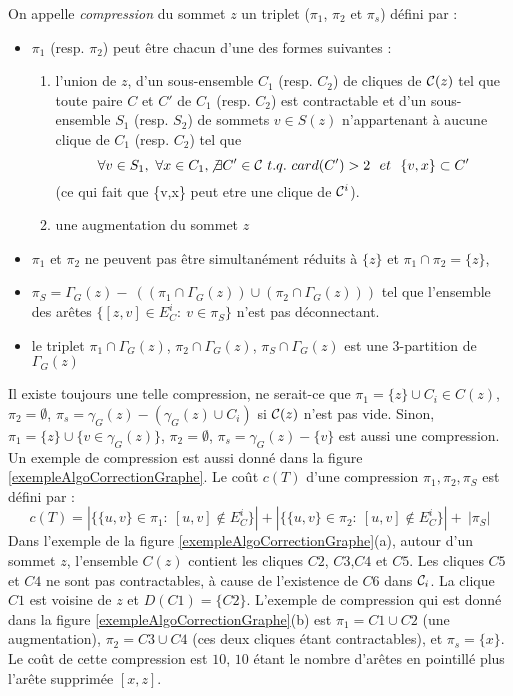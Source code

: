 \begin{definition}
On appelle {\em compression} du sommet $z$ un triplet ($\pi_1$, $\pi_2$ et $\pi_s$) d\'efini par : 
\begin{itemize}
	\item $\pi_1$ (resp. $\pi_2$) peut \^etre  chacun d'une des formes suivantes :
	\begin{enumerate}
		\item l'union de $z$, d'un sous-ensemble $C_1$ (resp. $C_2$) de cliques de ${\cal C}(z)$ tel que toute paire $C$ et $C'$ de $C_1$ (resp. $C_2$) est contractable et d'un sous-ensemble $S_1$ (resp. $S_2$) de sommets $v \in S(z)$ n'appartenant \`a aucune clique de $C_1$ (resp. $C_2$) tel que
		$$ \forall v \in S_1,~\forall x \in C_1, \not\exists C' \in {\cal C}~t.q.~card(C')>2~~et~~\{v,x\} \subset C'$$
		(ce qui fait que \{v,x\} peut etre une clique de ${\cal C}^i$).
		\item une augmentation du sommet $z$
	\end{enumerate}
	\item $\pi_1$ et $\pi_2$ ne peuvent pas \^etre simultan\'ement r\'eduits \`a $\{z\}$ et $\pi_1 \cap \pi_2 = \{z\}$,
	\item $\pi_S=\Gamma_G(z)-~((\pi_1 \cap \Gamma_G(z)) \cup(\pi_2 \cap \Gamma_G(z)))$ tel que l'ensemble des ar\^etes  $\{[z,v]\in E_{C}^{i}:~v\in \pi_S\}$ n'est pas d\'econnectant.
	\item le triplet $\pi_{1} \cap \Gamma_{G}(z)$, $\pi_{2} \cap \Gamma_{G}(z)$, $\pi_{S} \cap \Gamma_{G}(z)$  est une 3-partition de $\Gamma_G(z)$
\end{itemize}
\end{definition}
Il existe toujours une telle compression, ne serait-ce que 
$\pi_1 = \{z\} \cup C_i \in C(z)$, 
$\pi_2 =  \emptyset$,
$\pi_s = \gamma_G(z) -(\gamma_G(z) \cup C_i) $  si ${\cal C}(z)$ n'est pas vide.
Sinon, 
$\pi_1 = \{z\} \cup \{ v \in \gamma_G(z)  \} $, 
$\pi_2 =  \emptyset$,
$\pi_s = \gamma_G(z) - \{v\} $
est aussi une compression.
Un exemple de compression est aussi donn\'e dans la figure \ref{exempleAlgoCorrectionGraphe}.
Le co\^ut $c(T)$ d'une compression $\pi_{1},\pi_{2},\pi_{S}$ est d\'efini par : 
$$c(T) = | \{\{u,v\} \in \pi_{1}:~[u,v]\not\in E_{C}^{i}\}| + |\{\{u,v\} \in \pi_2:~[u,v]\not\in E_{C}^{i}\}| +~ |\pi_S| $$
Dans l'exemple de la figure \ref{exempleAlgoCorrectionGraphe}(a), autour d'un sommet $z$, l'ensemble $C(z)$ contient les cliques $C2$, $C3$,$C4$ et $C5$.
Les cliques $C5$ et $C4$ ne sont pas contractables, \`a cause de l'existence de $C6$ dans ${\cal C}_i$.
La clique $C1$ est voisine de $z$ et $D(C1) = \{C2\}$.
L'exemple de compression qui est donn\'e dans la figure \ref{exempleAlgoCorrectionGraphe}(b) est $\pi_1 = C1 \cup C2$ (une augmentation), $\pi_2 = C3 \cup C4$ (ces deux cliques \'etant contractables), et $\pi_s = \{x\}$.
Le co\^ut  de cette compression est $10$, $10$ \'etant le nombre d'ar\^etes en pointill\'e plus l'ar\^ete supprim\'ee $[x,z]$.
\newline

